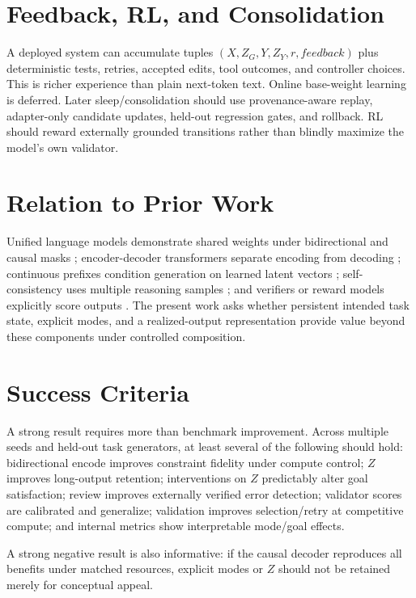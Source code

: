 \documentclass[11pt]{article}
\begin{document}
\section{Feedback, RL, and Consolidation}
A deployed system can accumulate tuples $(X,Z_G,Y,Z_Y,r,feedback)$ plus deterministic tests, retries, accepted edits, tool outcomes, and controller choices. This is richer experience than plain next-token text. Online base-weight learning is deferred. Later sleep/consolidation should use provenance-aware replay, adapter-only candidate updates, held-out regression gates, and rollback. RL should reward externally grounded transitions rather than blindly maximize the model's own validator.

\section{Relation to Prior Work}
Unified language models demonstrate shared weights under bidirectional and causal masks \citep{dong2019unified}; encoder-decoder transformers separate encoding from decoding \citep{vaswani2017attention,raffel2020exploring}; continuous prefixes condition generation on learned latent vectors \citep{li2021prefixtuning}; self-consistency uses multiple reasoning samples \citep{wang2023selfconsistency}; and verifiers or reward models explicitly score outputs \citep{cobbe2021verifiers,ouyang2022training}. The present work asks whether persistent intended task state, explicit modes, and a realized-output representation provide value beyond these components under controlled composition.

\section{Success Criteria}
A strong result requires more than benchmark improvement. Across multiple seeds and held-out task generators, at least several of the following should hold: bidirectional encode improves constraint fidelity under compute control; $Z$ improves long-output retention; interventions on $Z$ predictably alter goal satisfaction; review improves externally verified error detection; validator scores are calibrated and generalize; validation improves selection/retry at competitive compute; and internal metrics show interpretable mode/goal effects.

A strong negative result is also informative: if the causal decoder reproduces all benefits under matched resources, explicit modes or $Z$ should not be retained merely for conceptual appeal.
\end{document}
